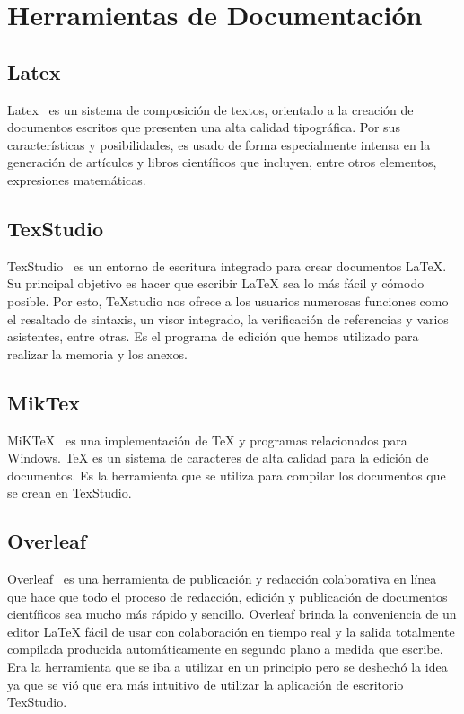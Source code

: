 \section{Herramientas de Documentación}

\subsection{Latex}
 Latex~\cite{latex} es un sistema de composición de textos, orientado a la creación de documentos escritos que presenten una alta calidad tipográfica. Por sus características y posibilidades, es usado de forma especialmente intensa en la generación de artículos y libros científicos que incluyen, entre otros elementos, expresiones matemáticas.
 
\subsection{TexStudio}
TexStudio~\cite{TexStudio} es un entorno de escritura integrado para crear documentos LaTeX. Su principal objetivo es hacer que escribir LaTeX sea lo más fácil y cómodo posible. Por esto, TeXstudio nos ofrece a los usuarios numerosas funciones como el resaltado de sintaxis, un visor integrado, la verificación de referencias y varios asistentes, entre otras. 
Es el programa de edición que hemos utilizado para realizar la memoria y los anexos.

\subsection{MikTex}
MiKTeX~\cite{TexStudio} es una implementación de TeX y programas relacionados para Windows. TeX es un sistema de caracteres de alta calidad para la edición de documentos.
Es la herramienta que se utiliza para compilar los documentos que se crean en TexStudio.
\subsection{Overleaf}
Overleaf~\cite{Overleaf}  es una herramienta de publicación y redacción colaborativa en línea que hace que todo el proceso de redacción, edición y publicación de documentos científicos sea mucho más rápido y sencillo. Overleaf brinda la conveniencia de un editor LaTeX fácil de usar con colaboración en tiempo real y la salida totalmente compilada producida automáticamente en segundo plano a medida que escribe.
Era la herramienta que se iba a utilizar en un principio pero se deshechó la idea ya que se vió que era más intuitivo de utilizar la aplicación de escritorio TexStudio.

